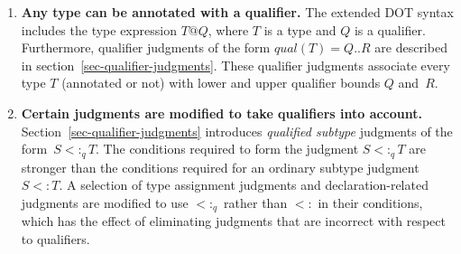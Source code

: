 \begin{enumerate}

\item{\bf Any type can be annotated with a qualifier.}
The extended DOT syntax includes the type expression \mbox{$T@Q$},
where $T$ is a type and $Q$ is a qualifier.
Furthermore, qualifier judgments of the form \mbox{$qual(T)=Q..R$}
are described in section~\ref{sec-qualifier-judgments}.
These qualifier judgments associate every type $T$ (annotated or not)
with lower and upper qualifier bounds $Q$ and~$R$.



\item {\bf Certain judgments are modified to take qualifiers into account.}
Section~\ref{sec-qualifier-judgments} introduces {\em qualified subtype}
judgments of the form~\mbox{$S <:_q T$}.
The conditions required to form the judgment \mbox{$S <:_q T$} are
stronger than the conditions required for an ordinary subtype judgment~\mbox{$S <: T$}.
A selection of type assignment judgments and declaration-related judgments
are modified to use \mbox{$<:_q$} rather than \mbox{$<:$} in their conditions,
which has the effect of eliminating judgments that are incorrect with respect to qualifiers.





\end{enumerate}
